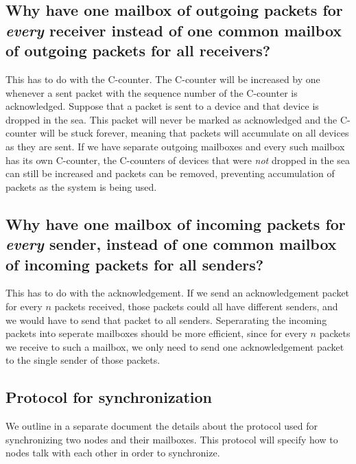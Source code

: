 \documentclass{article}
\begin{document}
\subsection{Why have one mailbox of outgoing packets for \emph{every} receiver instead of one common mailbox of outgoing packets for all receivers?}
This has to do with the C-counter. The C-counter will be increased by one whenever a sent packet with the sequence number of the C-counter is acknowledged. Suppose that a packet is sent to a device and that device is dropped in the sea. This packet will never be marked as acknowledged and the C-counter will be stuck forever, meaning that packets will accumulate on all devices as they are sent. If we have separate outgoing mailboxes and every such mailbox has its own C-counter, the C-counters of devices that were \emph{not} dropped in the sea can still be increased and packets can be removed, preventing accumulation of packets as the system is being used.

\subsection{Why have one mailbox of incoming packets for \emph{every} sender, instead of one common mailbox of incoming packets for all senders?}
This has to do with the acknowledgement. If we send an acknowledgement packet for every $n$ packets received, those packets could all have different senders, and we would have to send that packet to all senders. Seperarating the incoming packets into seperate mailboxes should be more efficient, since for every $n$ packets we receive to such a mailbox, we only need to send one acknowledgement packet to the single sender of those packets.

\subsection{Protocol for synchronization}
We outline in a separate document the details about the protocol used for synchronizing two nodes and their mailboxes. This protocol will specify how to nodes talk with each other in order to synchronize.
\end{document}
